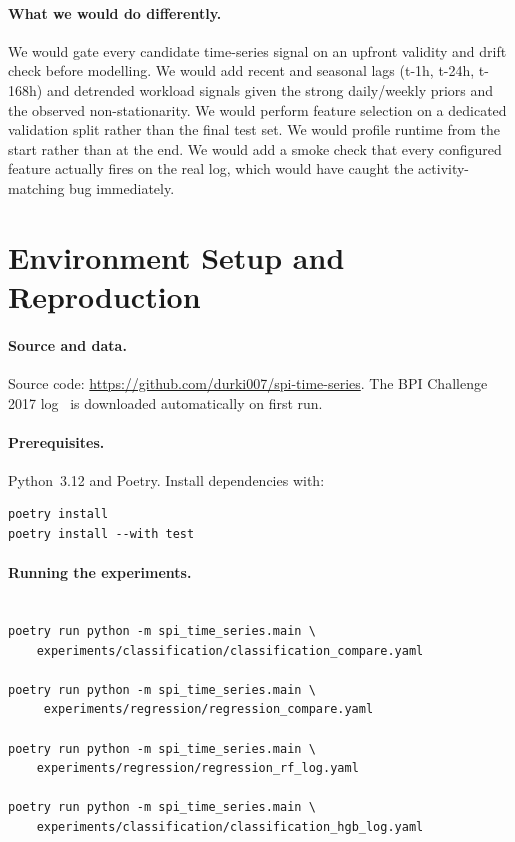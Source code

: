 \documentclass[runningheads]{llncs}
\begin{document}
\paragraph{What we would do differently.}
We would gate every candidate time-series signal on an upfront validity and
drift check before modelling. We would add recent and seasonal lags (t-1h, t-24h, t-168h)
and detrended workload signals given the strong daily/weekly priors and the
observed non-stationarity. We would perform feature selection on a dedicated validation
split rather than the final test set. We would profile runtime from the start rather than
at the end. We would add a smoke check that every configured feature actually fires
on the real log, which would have caught the activity-matching bug immediately.




\appendix
\section{Environment Setup and Reproduction}
\label{app:repro}

\paragraph{Source and data.}
Source code: \url{https://github.com/durki007/spi-time-series}. The BPI
Challenge 2017 log~\cite{bpic2017} is downloaded automatically on first run.

\paragraph{Prerequisites.}
Python~3.12 and Poetry. Install dependencies with:
\begin{verbatim}
poetry install                
poetry install --with test    
\end{verbatim}

\paragraph{Running the experiments.}
\begin{verbatim}

poetry run python -m spi_time_series.main \
    experiments/classification/classification_compare.yaml
    
poetry run python -m spi_time_series.main \
     experiments/regression/regression_compare.yaml

poetry run python -m spi_time_series.main \
    experiments/regression/regression_rf_log.yaml

poetry run python -m spi_time_series.main \
    experiments/classification/classification_hgb_log.yaml

\end{verbatim}
\end{document}
